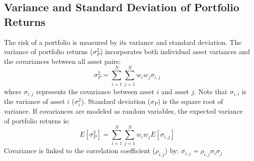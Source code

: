 \subsection{Variance and Standard Deviation of Portfolio Returns}
\label{subsec:Variance and Standard Deviation}
The risk of a portfolio is measured by its variance and standard deviation. The variance of portfolio returns ($\sigma_P^2$) incorporates both individual asset variances and the covariances between all asset pairs:
\begin{equation}
	\sigma_P^2 = \sum_{i=1}^N \sum_{j=1}^N w_i w_j \sigma_{i,j}
	\label{eq:portfolio_variance_sum_m8}
\end{equation}
where $\sigma_{i,j}$ represents the covariance between asset $i$ and asset $j$. Note that $\sigma_{i,i}$ is the variance of asset $i$ ($\sigma_i^2$).
Standard deviation ($\sigma_P$) is the square root of variance.
If covariances are modeled as random variables, the expected variance of portfolio returns is:
\begin{equation}
	E[\sigma_P^2] = \sum_{i=1}^N \sum_{j=1}^N w_i w_j E[\sigma_{i,j}]
	\label{eq:portfolio_expected_variance_m8}
\end{equation}
Covariance is linked to the correlation coefficient ($\rho_{i,j}$) by: $\sigma_{i,j} = \rho_{i,j} \sigma_i \sigma_j$

